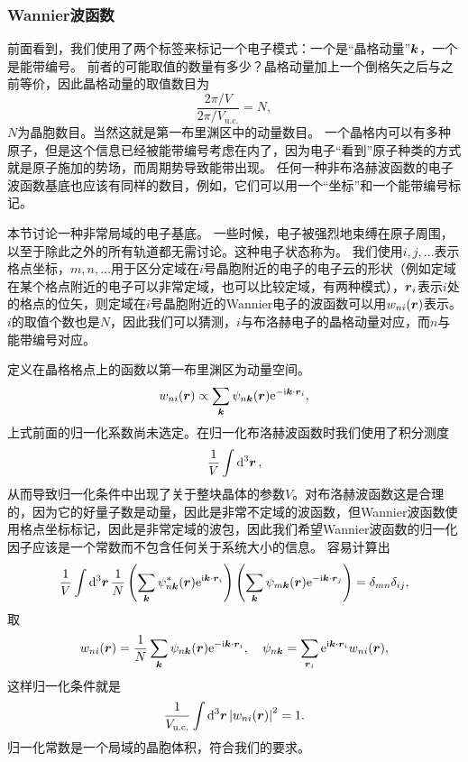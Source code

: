 \subsubsection{Wannier波函数}

前面看到，我们使用了两个标签来标记一个电子模式：一个是“晶格动量”$\vb*{k}$，一个是能带编号。
前者的可能取值的数量有多少？晶格动量加上一个倒格矢之后与之前等价，因此晶格动量的取值数目为
\[
    \frac{2\pi / V}{2\pi / V_\text{u.c.}} = N,
\]
$N$为晶胞数目。当然这就是第一布里渊区中的动量数目。
一个晶格内可以有多种原子，但是这个信息已经被能带编号考虑在内了，因为电子“看到”原子种类的方式就是原子施加的势场，而周期势导致能带出现。
任何一种非布洛赫波函数的电子波函数基底也应该有同样的数目，例如，它们可以用一个“坐标”和一个能带编号标记。

本节讨论一种非常局域的电子基底。
一些时候，电子被强烈地束缚在原子周围，以至于除此之外的所有轨道都无需讨论。这种电子状态称为。
我们使用$i, j, \ldots$表示格点坐标，$m, n, \ldots$用于区分定域在$i$号晶胞附近的电子的电子云的形状（例如定域在某个格点附近的电子可以非常定域，也可以比较定域，有两种模式），$\vb*{r}_i$表示$i$处的格点的位矢，则定域在$i$号晶胞附近的Wannier电子的波函数可以用$w_{ni}(\vb*{r})$表示。
$i$的取值个数也是$N$，因此我们可以猜测，$i$与布洛赫电子的晶格动量对应，而$n$与能带编号对应。

定义在晶格格点上的函数以第一布里渊区为动量空间。
\[
    w_{ni}(\vb*{r}) \propto \sum_{\vb*{k}} \psi_{n\vb*{k}}(\vb*{r}) \mathrm{e}^{- \mathrm{i} \vb*{k} \cdot \vb*{r}_i},
\]
上式前面的归一化系数尚未选定。在归一化布洛赫波函数时我们使用了积分测度
\[
    \frac{1}{V} \int \dd[3]{\vb*{r}},
\]
从而导致归一化条件中出现了关于整块晶体的参数$V$。对布洛赫波函数这是合理的，因为它的好量子数是动量，因此是非常不定域的波函数，但Wannier波函数使用格点坐标标记，因此是非常定域的波包，因此我们希望Wannier波函数的归一化因子应该是一个常数而不包含任何关于系统大小的信息。
容易计算出
\[
    \frac{1}{V} \int \dd[3]{\vb*{r}} \frac{1}{N} \left( \sum_{\vb*{k}} \psi^*_{n\vb*{k}}(\vb*{r}) \mathrm{e}^{\mathrm{i} \vb*{k} \cdot \vb*{r}_i} \right) \left( \sum_{\vb*{k}} \psi_{m\vb*{k}}(\vb*{r}) \mathrm{e}^{- \mathrm{i} \vb*{k} \cdot \vb*{r}_j} \right) = \delta_{mn} \delta_{ij},
\]
取
\begin{equation}
    w_{ni}(\vb*{r}) = \frac{1}{N} \sum_{\vb*{k}} \psi_{n\vb*{k}}(\vb*{r}) \mathrm{e}^{-\mathrm{i} \vb*{k} \cdot \vb*{r}_i}, \quad \psi_{n\vb*{k}} = \sum_{\vb*{r}_i} \mathrm{e}^{\mathrm{i} \vb*{k} \cdot \vb*{r}_i} w_{ni}(\vb*{r}),
\end{equation}
这样归一化条件就是
\begin{equation}
    \frac{1}{V_\text{u.c.}} \int \dd[3]{\vb*{r}} \abs{w_{ni}(\vb*{r})}^2 = 1.
\end{equation}
归一化常数是一个局域的晶胞体积，符合我们的要求。

